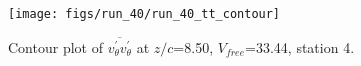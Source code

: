 \begin{figure}[H]
\centering
\texttt{[image: figs/run\_40/run\_40\_tt\_contour]}
\caption{Contour plot of $\overline{v_{\theta}^{\prime} v_{\theta}^{\prime}}$ at $z/c$=8.50, $V_{free}$=33.44, station 4.}
\label{fig:run_40_tt_contour}
\end{figure}


